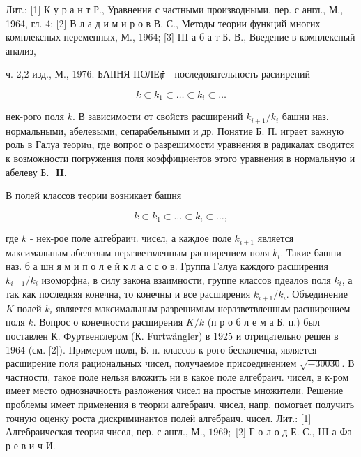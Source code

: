 \documentclass[10pt]{article}
\begin{document}
Лит.: [1] К у р а н т Р., Уравнения с частными производными, пер. с англ., М., 1964, гл. 4; [2] В л а д и м и р о в В. С., Методы теории функций многих комплексных переменных, М., 1964; [3] III а б а т Б. В., Введение в комплексный анализ,

ч. 2,2 изд., М., 1976. БАІІНЯ ПОЛЕர̆ - последовательность расиирений



\[

k \subset k_{1} \subset \ldots \subset k_{i} \subset \ldots

\]



нек-рого поля $k$. В зависимости от свойств расширений $k_{i+1} / k_{i}$ башни наз. нормальными, абелевыми, сепарабельными и др. Понятие Б. П. играет важную роль в Галуа теориu, где вопрос о разрешимости уравнения в радикалах сводится к возможности погружения поля коэффициентов этого уравнения в нормальную и абелеву Б. $\boldsymbol{\text { II. }}$



В полей классов теории возникает башня



\[

k \subset k_{1} \subset \ldots \subset k_{i} \subset \ldots,

\]



где $k$ - нек-рое поле алгебраич. чисел, а каждое поле $k_{i+1}$ является максимальным абелевым неразветвленным расширением поля $k_{i}$. Такие башни наз. б а шн я м и п о л е й к л а с с о в. Группа Галуа каждого расширения $k_{i+1} / k_{i}$ изоморфна, в силу закона взаимности, группе классов пдеалов поля $k_{i}$, а так как последняя конечна, то конечны и все расширения $k_{i+1} / k_{i}$. Объединение $K$ полей $k_{i}$ является максимальным разрешимым неразветвленным расширением поля $k$. Вопрос о конечности расширения $K / k$ (п р о б л е м а Б. п.) был поставлен К. Фуртвенглером (К. Furtwängler) в 1925 и отрицательно решен в 1964 (см. [2]). Примером поля, Б. п. классов к-рого бесконечна, является расширение поля рациональных чисел, получаемое присоединением $\sqrt{-30030}$. В частности, такое поле нельзя вложить ни в какое поле алгебраич. чисел, в к-ром имеет место однозначность разложения чисел на простые множители. Решение проблемы имеет применения в теории алгебраич. чисел, напр. помогает получить точную оценку роста дискриминантов полей алгебраич. чисел. Лит.: [1] Алгебраическая теория чисел, пер. с англ., М., $1969 ;$ [2] Г о л о д Е. С., III а Фа р е в и ч И.
\end{document}
